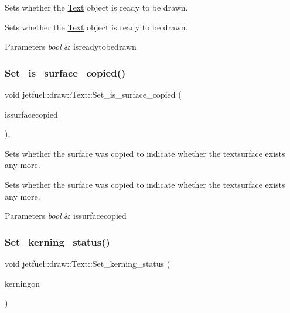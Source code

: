 Sets whether the \hyperlink{classjetfuel_1_1draw_1_1Text}{Text} object is ready to be drawn. 

Sets whether the \hyperlink{classjetfuel_1_1draw_1_1Text}{Text} object is ready to be drawn.


\begin{DoxyParams}{Parameters}
{\em bool} & isreadytobedrawn \\
\hline
\end{DoxyParams}
\mbox{\label{classjetfuel_1_1draw_1_1Text_ab5b09d74d05260a4f903cb9d780c1948}} 
\subsubsection{\texorpdfstring{Set\+\_\+is\+\_\+surface\+\_\+copied()}{Set\_is\_surface\_copied()}}
{\footnotesize\ttfamily void jetfuel\+::draw\+::\+Text\+::\+Set\+\_\+is\+\_\+surface\+\_\+copied (\begin{DoxyParamCaption}\item[{bool}]{issurfacecopied }\end{DoxyParamCaption})\hspace{0.3cm}{\ttfamily [inline]}, {\ttfamily [protected]}}



Sets whether the surface was copied to indicate whether the textsurface exists any more. 

Sets whether the surface was copied to indicate whether the textsurface exists any more.


\begin{DoxyParams}{Parameters}
{\em bool} & issurfacecopied \\
\hline
\end{DoxyParams}
\mbox{\label{classjetfuel_1_1draw_1_1Text_afdd2ce09d49b3df880939af1a5d5053c}} 
\subsubsection{\texorpdfstring{Set\+\_\+kerning\+\_\+status()}{Set\_kerning\_status()}}
{\footnotesize\ttfamily void jetfuel\+::draw\+::\+Text\+::\+Set\+\_\+kerning\+\_\+status (\begin{DoxyParamCaption}\item[{const bool}]{kerningon }\end{DoxyParamCaption})\hspace{0.3cm}{\ttfamily [inline]}}



